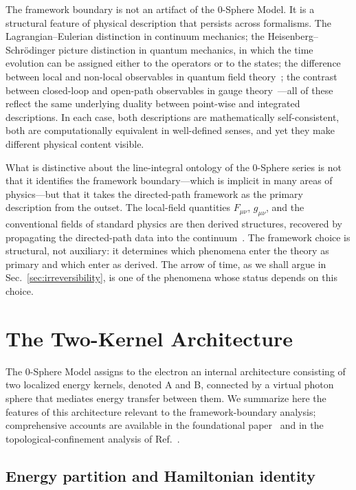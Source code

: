 \documentclass[%
 reprint, amsmath,amssymb, aps, prb, ]{revtex4-2}
\numberwithin{equation}{section}
\begin{document}
The framework boundary is not an artifact of the 0-Sphere Model. It is a structural feature of physical description that persists across formalisms. The Lagrangian--Eulerian distinction in continuum mechanics; the Heisenberg--Schr\"odinger picture distinction in quantum mechanics, in which the time evolution can be assigned either to the operators or to the states; the difference between local and non-local observables in quantum field theory~\cite{Mandelstam1968, Polyakov1979}; the contrast between closed-loop and open-path observables in gauge theory~\cite{WuYang1975}---all of these reflect the same underlying duality between point-wise and integrated descriptions. In each case, both descriptions are mathematically self-consistent, both are computationally equivalent in well-defined senses, and yet they make different physical content visible.

What is distinctive about the line-integral ontology of the 0-Sphere series is not that it identifies the framework boundary---which is implicit in many areas of physics---but that it takes the directed-path framework as the primary description from the outset. The local-field quantities $F_{\mu\nu}$, $g_{\mu\nu}$, and the conventional fields of standard physics are then derived structures, recovered by propagating the directed-path data into the continuum~\cite{hanamura55}. The framework choice is structural, not auxiliary: it determines which phenomena enter the theory as primary and which enter as derived. The arrow of time, as we shall argue in Sec.~\ref{sec:irreversibility}, is one of the phenomena whose status depends on this choice.


\section{The Two-Kernel Architecture}
\label{sec:twokernel}

The 0-Sphere Model assigns to the electron an internal architecture consisting of two localized energy kernels, denoted A and B, connected by a virtual photon sphere that mediates energy transfer between them. We summarize here the features of this architecture relevant to the framework-boundary analysis; comprehensive accounts are available in the foundational paper~\cite{hanamura01} and in the topological-confinement analysis of Ref.~\cite{hanamura33}.

\subsection{Energy partition and Hamiltonian identity}
\label{sec:energy_partition}
\end{document}
